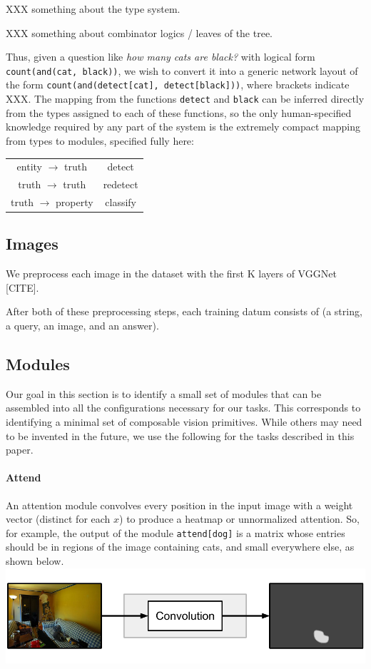 \documentclass[10pt,twocolumn,letterpaper]{article}
\begin{document}
XXX something about the type system.

XXX something about combinator logics / leaves of the tree.

Thus, given a question like \emph{how many cats are black?} with logical form
{\small\tt count(and(cat, black))}, we wish to convert it into a generic network
layout of the form {\small\tt count(and(detect[cat], detect[black]))}, where
brackets indicate XXX. The mapping from the functions {\small\tt detect} and
{\small\tt black} can be inferred directly from the types assigned to each of
these functions, so the only human-specified knowledge required by any part of
the system is the extremely compact mapping from types to modules, specified
fully here:

\begin{tabular}{cc}
  entity $\to$ truth & detect \\
  truth $\to$ truth & redetect \\
  truth $\to$ property & classify \\
\end{tabular}

\subsection{Images}

We preprocess each image in the dataset with the first K layers of VGGNet [CITE].

After both of these preprocessing steps, each training datum consists of (a
string, a query, an image, and an answer).

\subsection{Modules}

Our goal in this section is to identify a small set of modules that can be
assembled into all the configurations necessary for our tasks. This corresponds
to identifying a minimal set of composable vision primitives. While others  may
need to be invented in the future, we use the following for the tasks described
in this paper.\\

\paragraph{Attend}

An attention module  convolves every position in the input image with a weight vector (distinct for each $x$) to produce a heatmap or unnormalized attention. So, for example, the output of the module {\small\tt attend[dog]} is a matrix whose entries should be in regions of the image containing cats, and small everywhere else, as shown below.\\[1em]
\includegraphics[width=\columnwidth]{fig/attend}
\end{document}
